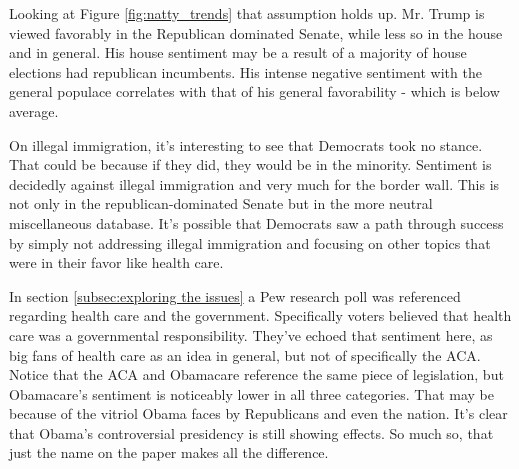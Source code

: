 \documentclass[11pt, twoside, reqno]{article}
\begin{document}
Looking at Figure \ref{fig:natty_trends} that assumption holds up. Mr. Trump is viewed favorably in the Republican dominated Senate, while less so in the house and in general. His house sentiment may be a result of a majority of house elections had republican incumbents. His intense negative sentiment with the general populace correlates with that of his general favorability - which is below average. 

On illegal immigration, it's interesting to see that Democrats took no stance. That could be because if they did, they would be in the minority. Sentiment is decidedly against illegal immigration and very much for the border wall. This is not only in the republican-dominated Senate but in the more neutral miscellaneous database. It's possible that Democrats saw a path through success by simply not addressing illegal immigration and focusing on other topics that were in their favor like health care. 

In section \ref{subsec:exploring the issues} a Pew research poll was referenced regarding health care and the government. Specifically voters believed that health care was a governmental responsibility. They've echoed that sentiment here, as big fans of health care as an idea in general, but not of specifically the ACA. Notice that the ACA and Obamacare reference the same piece of legislation, but Obamacare's sentiment is noticeably lower in all three categories. That may be because of the vitriol Obama faces by Republicans and even the nation. It's clear that Obama's controversial presidency is still showing effects. So much so, that just the name on the paper makes all the difference.  
\end{document}
